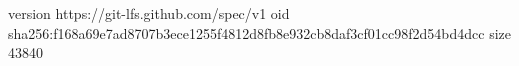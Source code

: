 version https://git-lfs.github.com/spec/v1
oid sha256:f168a69e7ad8707b3ece1255f4812d8fb8e932cb8daf3cf01cc98f2d54bd4dcc
size 43840
